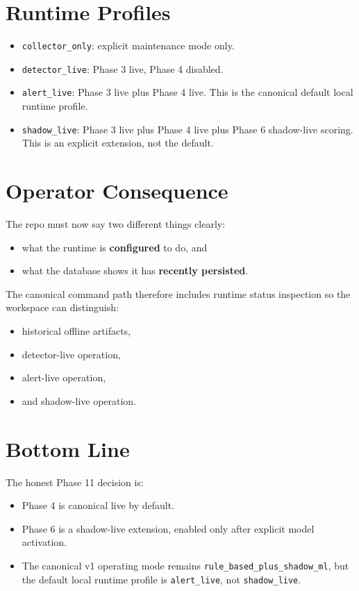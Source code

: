 \documentclass{article}
\begin{document}
\section*{Runtime Profiles}

\begin{itemize}
\item \texttt{collector\_only}: explicit maintenance mode only.
\item \texttt{detector\_live}: Phase 3 live, Phase 4 disabled.
\item \texttt{alert\_live}: Phase 3 live plus Phase 4 live. This is the
canonical default local runtime profile.
\item \texttt{shadow\_live}: Phase 3 live plus Phase 4 live plus Phase 6
shadow-live scoring. This is an explicit extension, not the default.
\end{itemize}

\section*{Operator Consequence}

The repo must now say two different things clearly:
\begin{itemize}
\item what the runtime is \textbf{configured} to do, and
\item what the database shows it has \textbf{recently persisted}.
\end{itemize}

The canonical command path therefore includes runtime status inspection so the
workspace can distinguish:
\begin{itemize}
\item historical offline artifacts,
\item detector-live operation,
\item alert-live operation,
\item and shadow-live operation.
\end{itemize}

\section*{Bottom Line}

The honest Phase 11 decision is:
\begin{itemize}
\item Phase 4 is canonical live by default.
\item Phase 6 is a shadow-live extension, enabled only after explicit model
activation.
\item The canonical v1 operating mode remains
\texttt{rule\_based\_plus\_shadow\_ml}, but the default local runtime profile is
\texttt{alert\_live}, not \texttt{shadow\_live}.
\end{itemize}
\end{document}
